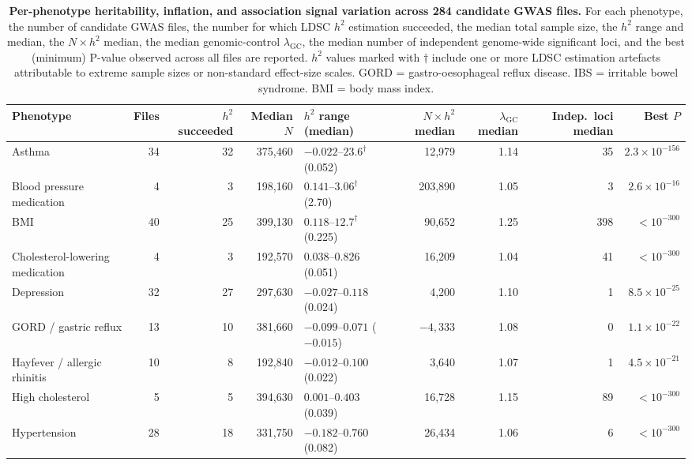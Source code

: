 \documentclass[11pt,a4paper]{article}
\begin{document}
\begin{table}[H]
\centering
\caption{\textbf{Per-phenotype heritability, inflation, and association signal variation across 284 candidate GWAS files.} For each phenotype, the number of candidate GWAS files, the number for which LDSC $h^2$ estimation succeeded, the median total sample size, the $h^2$ range and median, the $N \times h^2$ median, the median genomic-control $\lambda_{\text{GC}}$, the median number of independent genome-wide significant loci, and the best (minimum) P-value observed across all files are reported. $h^2$ values marked with $\dagger$ include one or more LDSC estimation artefacts attributable to extreme sample sizes or non-standard effect-size scales. GORD = gastro-oesophageal reflux disease. IBS = irritable bowel syndrome. BMI = body mass index.}
\label{tab}
\small
\begin{adjustbox}{max width=\textwidth}
\begin{tabular}{lrrrlrrrr}
\toprule
\textbf{Phenotype} &\textbf{Files} &\textbf{$h^2$ succeeded} &\textbf{Median $N$} &\textbf{$h^2$ range (median)} &\textbf{$N \times h^2$ median} &\textbf{$\lambda_{\text{GC}}$ median} &\textbf{Indep.\ loci median} &\textbf{Best $P$} \\
\midrule
Asthma &34 & 32 & 375,460 &$-0.022$--$23.6^{\dagger}$ (0.052) &12,979 & 1.14 & 35 &$2.3 \times 10^{-156}$ \\
\addlinespace
Blood pressure medication &4 & 3 & 198,160 &$0.141$--$3.06^{\dagger}$ (2.70) &203,890 & 1.05 & 3 &$2.6 \times 10^{-16}$ \\
\addlinespace
BMI &40 & 25 & 399,130 &$0.118$--$12.7^{\dagger}$ (0.225) &90,652 & 1.25 & 398 &$< 10^{-300}$ \\
\addlinespace
Cholesterol-lowering medication &4 & 3 & 192,570 &$0.038$--$0.826$ (0.051) &16,209 & 1.04 & 41 &$< 10^{-300}$ \\
\addlinespace
Depression &32 & 27 & 297,630 &$-0.027$--$0.118$ (0.024) &4,200 & 1.10 & 1 &$8.5 \times 10^{-25}$ \\
\addlinespace
GORD / gastric reflux &13 & 10 & 381,660 &$-0.099$--$0.071$ ($-0.015$) &$-4{,}333$ & 1.08 & 0 &$1.1 \times 10^{-22}$ \\
\addlinespace
Hayfever / allergic rhinitis &10 & 8 & 192,840 &$-0.012$--$0.100$ (0.022) &3,640 & 1.07 & 1 &$4.5 \times 10^{-21}$ \\
\addlinespace
High cholesterol &5 & 5 & 394,630 &$0.001$--$0.403$ (0.039) &16,728 & 1.15 & 89 &$< 10^{-300}$ \\
\addlinespace
Hypertension &28 & 18 & 331,750 &$-0.182$--$0.760$ (0.082) &26,434 & 1.06 & 6 &$< 10^{-300}$ \\

\end{tabular}
\end{adjustbox}
\end{table}
\end{document}
